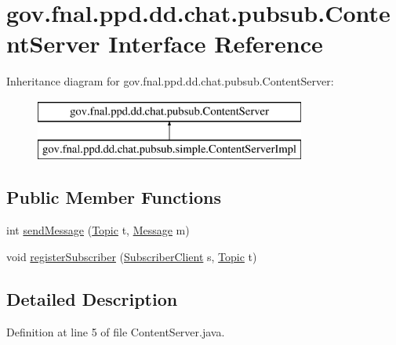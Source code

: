 \hypertarget{interfacegov_1_1fnal_1_1ppd_1_1dd_1_1chat_1_1pubsub_1_1ContentServer}{\section{gov.\-fnal.\-ppd.\-dd.\-chat.\-pubsub.\-Content\-Server Interface Reference}
\label{interfacegov_1_1fnal_1_1ppd_1_1dd_1_1chat_1_1pubsub_1_1ContentServer}
}
Inheritance diagram for gov.\-fnal.\-ppd.\-dd.\-chat.\-pubsub.\-Content\-Server\-:\begin{figure}[H]
\begin{center}
\leavevmode
\includegraphics[height=2.000000cm]{interfacegov_1_1fnal_1_1ppd_1_1dd_1_1chat_1_1pubsub_1_1ContentServer}
\end{center}
\end{figure}
\subsection*{Public Member Functions}
\begin{DoxyCompactItemize}
\item 
int \hyperlink{interfacegov_1_1fnal_1_1ppd_1_1dd_1_1chat_1_1pubsub_1_1ContentServer_a318b70dae02f4c5763820366bd84f534}{send\-Message} (\hyperlink{classgov_1_1fnal_1_1ppd_1_1dd_1_1chat_1_1pubsub_1_1Topic}{Topic} t, \hyperlink{interfacegov_1_1fnal_1_1ppd_1_1dd_1_1chat_1_1pubsub_1_1Message}{Message} m)
\item 
void \hyperlink{interfacegov_1_1fnal_1_1ppd_1_1dd_1_1chat_1_1pubsub_1_1ContentServer_a14cd665c62027f4cf0ffb849238f40ae}{register\-Subscriber} (\hyperlink{classgov_1_1fnal_1_1ppd_1_1dd_1_1chat_1_1pubsub_1_1simple_1_1SubscriberClient}{Subscriber\-Client} s, \hyperlink{classgov_1_1fnal_1_1ppd_1_1dd_1_1chat_1_1pubsub_1_1Topic}{Topic} t)
\end{DoxyCompactItemize}


\subsection{Detailed Description}


Definition at line 5 of file Content\-Server.\-java.



